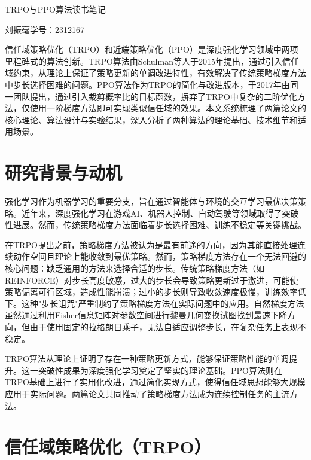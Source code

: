 \documentclass[12pt,a4paper]{article}
\newcommand{\chuhao}{\fontsize{21pt}{28pt}\selectfont}
\newcommand{\sanhao}{\fontsize{12pt}{16pt}\selectfont}
\begin{document}
\begin{center}
{\heiti\chuhao TRPO与PPO算法读书笔记}
\end{center}

\vspace{6pt}

\begin{center}
{\sanhao 刘振毫\quad 学号：2312167}
\end{center}

\vspace{18pt}

\setlength{\baselineskip}{20pt}
\sanhao

信任域策略优化（TRPO）和近端策略优化（PPO）是深度强化学习领域中两项里程碑式的算法创新。TRPO算法由Schulman等人于2015年提出，通过引入信任域约束，从理论上保证了策略更新的单调改进特性，有效解决了传统策略梯度方法中步长选择困难的问题。PPO算法作为TRPO的简化与改进版本，于2017年由同一团队提出，通过引入裁剪概率比的目标函数，摒弃了TRPO中复杂的二阶优化方法，仅使用一阶梯度方法即可实现类似信任域的效果。本文系统梳理了两篇论文的核心理论、算法设计与实验结果，深入分析了两种算法的理论基础、技术细节和适用场景。

\section{研究背景与动机}

强化学习作为机器学习的重要分支，旨在通过智能体与环境的交互学习最优决策策略。近年来，深度强化学习在游戏AI、机器人控制、自动驾驶等领域取得了突破性进展。然而，传统策略梯度方法面临着步长选择困难、训练不稳定等关键挑战。

在TRPO提出之前，策略梯度方法被认为是最有前途的方向，因为其能直接处理连续动作空间且理论上能收敛到最优策略。然而，策略梯度方法存在一个无法回避的核心问题：缺乏通用的方法来选择合适的步长。传统策略梯度方法（如REINFORCE）对步长高度敏感，过大的步长会导致策略更新过于激进，可能使策略偏离可行区域，造成性能崩溃；过小的步长则导致收敛速度极慢，训练效率低下。这种"步长诅咒"严重制约了策略梯度方法在实际问题中的应用。自然梯度方法虽然通过利用Fisher信息矩阵对参数空间进行黎曼几何变换试图找到最速下降方向，但由于使用固定的拉格朗日乘子，无法自适应调整步长，在复杂任务上表现不稳定。

TRPO算法从理论上证明了存在一种策略更新方式，能够保证策略性能的单调提升。这一突破性成果为深度强化学习奠定了坚实的理论基础。PPO算法则在TRPO基础上进行了实用化改进，通过简化实现方式，使得信任域思想能够大规模应用于实际问题。两篇论文共同推动了策略梯度方法成为连续控制任务的主流方法。

\section{信任域策略优化（TRPO）}
\end{document}
